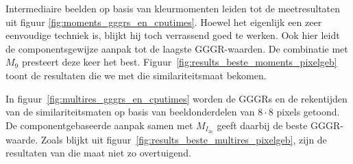 Intermediaire beelden op basis van kleurmomenten leiden tot de meetresultaten uit 
figuur \ref{fig:moments_gggrs_en_cputimes}. Hoewel het eigenlijk een zeer eenvoudige
techniek is, blijkt hij toch verrassend goed te werken. Ook hier leidt de
componentsgewijze aanpak tot de laagste GGGR-waarden. De combinatie met $M_9$ presteert
deze keer het best. Figuur~\ref{fig:results_beste_moments_pixelgeb} toont de resultaten
die we met die similariteitsmaat bekomen.

In figuur~\ref{fig:multires_gggrs_en_cputimes} worden de GGGRs en de rekentijden van
de similariteitsmaten op basis van beeldonderdelen van $8 \cdot 8$ pixels getoond.
De componentgebaseerde aanpak samen met
$M_{I_{3c}}$ geeft daarbij de beste GGGR-waarde. Zoals blijkt uit
figuur~\ref{fig:results_beste_multires_pixelgeb}, zijn de resultaten van die
maat niet zo overtuigend.

